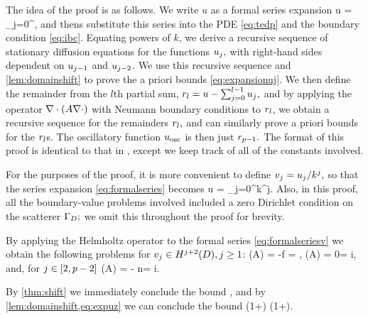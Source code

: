 The idea of the proof is as follows. We write $u$ as a formal series expansion
\beq\label{eq:formalseries}
u = \sum_{j=0}^\infty \usj,
\eeq
and thens substitute this series into the PDE \cref{eq:tedp} and the boundary condition \eqref{eq:ibc}. Equating powers of $k$, we derive a recursive sequence of stationary diffusion equations for the functions $u_{j},$ with right-hand sides dependent on $u_{j-1}$ and $u_{j-2}$. We use this recursive sequence and \cref{lem:domainshift} to prove the a priori bounds \cref{eq:expansionuj}. We then define the remainder from the $l$th partial sum, $r_{l} = u - \sum_{j=0}^{l-1} u_{j},$ and by applying the operator $\grad\cdot\mleft(A\grad \cdot\mright)$ with Neumann boundary conditions to $r_{l}$, we obtain a recursive sequence for the remainders $r_{l},$ and can similarly prove a priori bounds for the $r_{l}$s. The oscillatory function $u_{\mathrm{osc}}$ is then just $r_{p-1}.$ The format of this proof is identical to that in \cite[Theorem 1]{ChNi:18a}, except we keep track of all of the constants involved.

For the purposes of the proof, it is more convenient to define $v_{j} = u_{j}/k^j,$ so that the series expansion \cref{eq:formalseries} becomes
\beq\label{eq:formalseriesv}
u = \sum_{j=0}^\infty k^j\vj.
\eeq
Also, in this proof, all the boundary-value problems involved included a zero Dirichlet condition on the scatterer $\Gamma_{D};$ we omit this throughout the proof for brevity.

By applying the Helmholtz operator to the formal series \eqref{eq:formalseriesv} we obtain the following problems for $\vj \in \HjptD, j \geq 1$:
\beqs
\grad \cdot \mleft(A\grad \vz\mright) = -f \quad\tand\quad \dn \vz = \gI,
\eeqs
\beqs
\grad \cdot \mleft(A\grad \vo\mright) = 0\quad\tand\quad\dn \vo = i\vz,
\eeqs
and, for $j \in \mleft[2,p-2\mright]$
\beq\label{eq:vj}
\grad \cdot \mleft(A\grad \vj\mright) = - n\vjmt\quad\tand\quad\dn \vz = i\vjmo.
\eeq

By \cref{thm:shift} we immediately conclude the bound
\beq\label{eq:expuz}
\NHtD{\vz} \leq \CAz\Cfg,
\eeq
and by \cref{lem:domainshift,eq:expuz} we can conclude the bound
\beqs
\NHthD{\vo} \leq \CAo \mleft(1+\CTrt\mright) \leq \CAz \CAo \mleft(1+\CTrt\mright)\Cfg.
\eeqs

